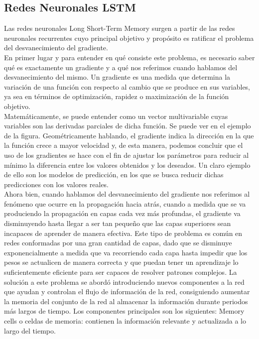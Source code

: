 \subsection{Redes Neuronales LSTM} 

Las redes neuronales Long Short-Term Memory surgen a partir de las redes neuronales recurrentes cuyo principal objetivo y propósito es ratificar el problema del desvanecimiento del gradiente. \\

En primer lugar y para entender en qué consiste este problema, es necesario saber qué es exactamente un gradiente y a qué nos referimos cuando hablamos del desvanecimiento del mismo. Un gradiente es una medida que determina la variación de una función con respecto al cambio que se produce en sus variables, ya sea en términos de optimización, rapidez o maximización de la función objetivo. \\

Matemáticamente, se puede entender como un vector multivariable cuyas variables son las derivadas parciales de dicha función. Se puede ver en el ejemplo de la figura. Geométricamente hablando, el gradiente indica la dirección en la que la función crece a mayor velocidad y, de esta manera, podemos concluir que el uso de los gradientes se hace con el fin de ajustar los parámetros para reducir al mínimo la diferencia entre los valores obtenidos y los deseados. Un claro ejemplo de ello son los modelos de predicción, en los que se busca reducir dichas predicciones con los valores reales. \\

Ahora bien, cuando hablamos del desvanecimiento del gradiente nos referimos al fenómeno que ocurre en la propagación hacia atrás, cuando a medida que se va produciendo la propagación en capas cada vez más profundas, el gradiente va disminuyendo hasta llegar a ser tan pequeño que las capas superiores sean incapaces de aprender de manera efectiva. Este tipo de problema es común en redes conformadas por una gran cantidad de capas, dado que se disminuye exponencialmente a medida que va recorriendo cada capa hasta impedir que los pesos se actualicen de manera correcta y que puedan tener un aprendizaje lo suficientemente eficiente para ser capaces de resolver patrones complejos.
La solución a este problema se abordó introduciendo nuevos componentes a la red que ayudan y controlan el flujo de información de la red, consiguiendo aumentar la memoria del conjunto de la red al almacenar la información durante periodos más largos de tiempo. Los componentes principales son los siguientes:
Memory cells o celdas de memoria: contienen la información relevante  y actualizada a lo largo del tiempo.\\ 

